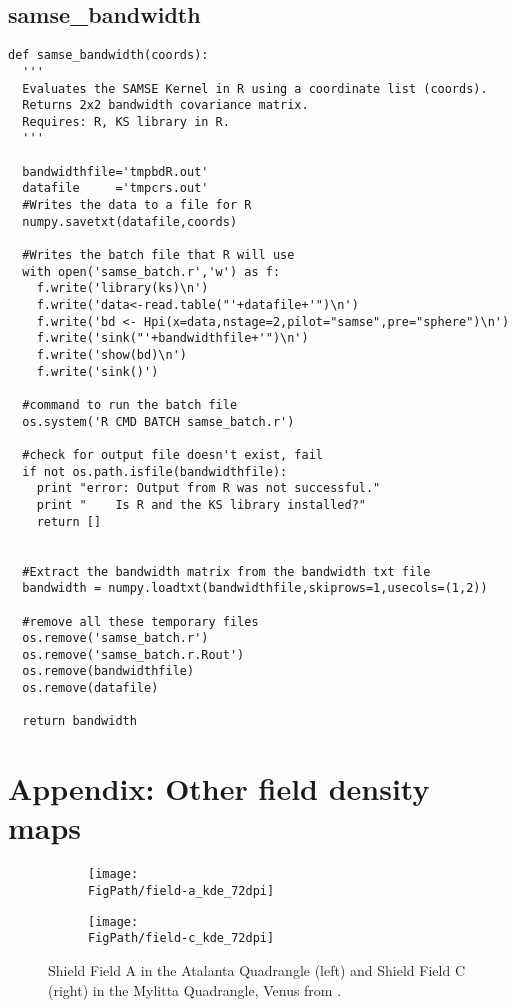 \subsection{samse\_bandwidth}
\begin{verbatim}
def samse_bandwidth(coords):
  '''
  Evaluates the SAMSE Kernel in R using a coordinate list (coords).
  Returns 2x2 bandwidth covariance matrix.
  Requires: R, KS library in R.
  '''
  
  bandwidthfile='tmpbdR.out'
  datafile     ='tmpcrs.out'
  #Writes the data to a file for R
  numpy.savetxt(datafile,coords)
  
  #Writes the batch file that R will use
  with open('samse_batch.r','w') as f:
    f.write('library(ks)\n')
    f.write('data<-read.table("'+datafile+'")\n')
    f.write('bd <- Hpi(x=data,nstage=2,pilot="samse",pre="sphere")\n')
    f.write('sink("'+bandwidthfile+'")\n')
    f.write('show(bd)\n')
    f.write('sink()')
  
  #command to run the batch file
  os.system('R CMD BATCH samse_batch.r')
  
  #check for output file doesn't exist, fail
  if not os.path.isfile(bandwidthfile):
    print "error: Output from R was not successful."
    print "    Is R and the KS library installed?"
    return []
  
  
  #Extract the bandwidth matrix from the bandwidth txt file
  bandwidth = numpy.loadtxt(bandwidthfile,skiprows=1,usecols=(1,2))
  
  #remove all these temporary files
  os.remove('samse_batch.r')
  os.remove('samse_batch.r.Rout')
  os.remove(bandwidthfile)
  os.remove(datafile)
  
  return bandwidth
\end{verbatim}


\newpage
\section{Appendix: Other field density maps}

\begin{figure}[h!]
\centering
\begin{subfigure}{0.49\textwidth}
\centering
\texttt{[image: \\FigPath/field-a\_kde\_72dpi]}
\end{subfigure}
\begin{subfigure}{0.49\textwidth}
\centering
\texttt{[image: \\FigPath/field-c\_kde\_72dpi]}
\end{subfigure}
\caption[Shield Field A in the Atalanta Quadrangle and Shield Field C in the Mylitta Quadrangle, Venus from \citet{miller2012shield}]{Shield Field A in the Atalanta Quadrangle (left) and Shield Field C (right) in the Mylitta Quadrangle, Venus from \citet{miller2012shield}.}
\end{figure}

